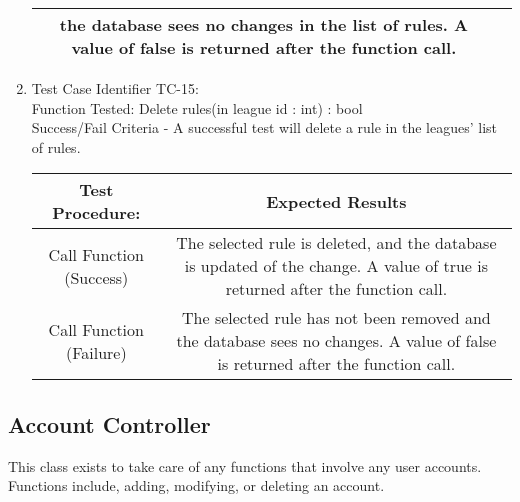 \begin{enumerate}
\begin{tabular}{| c | c |}
    the database sees no changes in the list of rules. A value of false is
    returned after the function call.\\ \hline
    \end{tabular}
  \item
  Test Case Identifier TC-15:\\
    Function Tested: Delete rules(in league id : int) : bool\\
    Success/Fail Criteria - A successful test will delete a rule in the
    leagues’ list of rules. \\
    \begin{tabular}{| c | c |}
    \hline
    \textbf{Test Procedure:} & \textbf{Expected Results} \\ \hline
    Call Function (Success) & The selected rule is deleted, and the database is
    updated of the change. A value of true is returned after the function call.
    \\ \hline
    Call Function (Failure) & The selected rule has not been removed and the
    database sees no changes. A value of false is returned after the function
    call.\\ \hline
    \end{tabular}
  \end{enumerate}

\subsection{Account Controller}

This class exists to take care of any functions that involve any user accounts.
Functions include, adding, modifying, or deleting an account. \\

